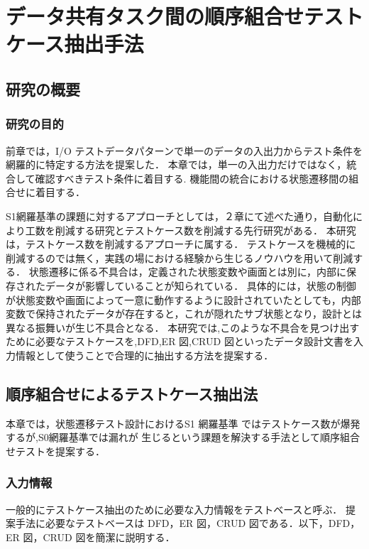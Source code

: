 \chapter{データ共有タスク間の順序組合せテストケース抽出手法} \label{chap:5}
\section{研究の概要} \label{sec:5-1}
\subsection{研究の目的} \label{sec:5-1-1}
前章では，I/O テストデータパターンで単一のデータの入出力からテスト条件を網羅的に特定する方法を提案した．
本章では，単一の入出力だけではなく，統合して確認すべきテスト条件に着目する.
機能間の統合における状態遷移間の組合せに着目する．

S1網羅基準の課題に対するアプローチとしては，２章にて述べた通り，自動化により工数を削減する研究とテストケース数を削減する先行研究がある．
本研究は，テストケース数を削減するアプローチに属する．
テストケースを機械的に削減するのでは無く，実践の場における経験から生じるノウハウを用いて削減する．
状態遷移に係る不具合は，定義された状態変数や画面とは別に，内部に保存されたデータが影響していることが知られている．
具体的には，状態の制御が状態変数や画面によって一意に動作するように設計されていたとしても，内部変数で保持されたデータが存在すると，これが隠れたサブ状態となり，設計とは異なる振舞いが生じ不具合となる．
本研究では,このような不具合を見つけ出すために必要なテストケースを,DFD,ER 図,CRUD 図といったデータ設計文書を入力情報として使うことで合理的に抽出する方法を提案する．

\section{順序組合せによるテストケース抽出法} \label{sec:5-2}
本章では，状態遷移テスト設計におけるS1 網羅基準 ではテストケース数が爆発するが,S0網羅基準では漏れが 生じるという課題を解決する手法として順序組合せテストを提案する．

\subsection{入力情報}
 一般的にテストケース抽出のために必要な入力情報をテストベースと呼ぶ\cite{Demarco}．
提案手法に必要なテストベースは DFD，ER 図，CRUD 図である．以下，DFD，ER 図，CRUD 図を簡潔に説明する．

